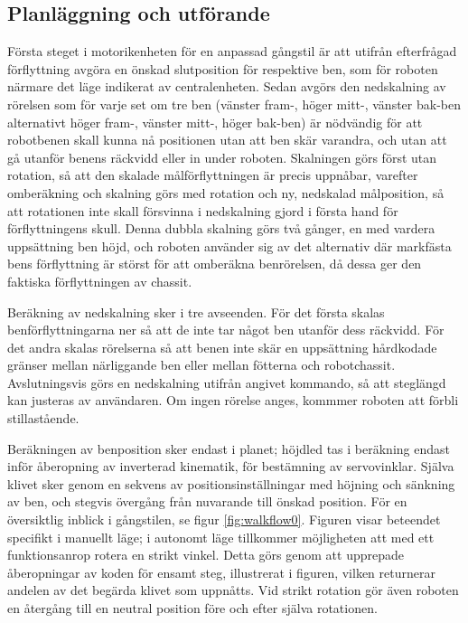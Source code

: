 \documentclass[a4paper,titlepage,12pt]{article}
\begin{document}
		\subsection{Planläggning och utförande}
	Första steget i motorikenheten för en anpassad gångstil är att utifrån efterfrågad
	förflyttning avgöra en önskad slutposition för respektive ben, som för roboten närmare 
	det läge indikerat av centralenheten. Sedan avgörs den nedskalning av rörelsen som för 
	varje set om tre ben (vänster fram-, höger mitt-, vänster bak-ben alternativt höger fram-, 
	vänster mitt-, höger bak-ben) är nödvändig för att robotbenen skall kunna nå positionen utan att ben 
        skär varandra, och utan att gå utanför benens räckvidd eller in under roboten. Skalningen 
        görs först utan rotation, så att den skalade målförflyttningen är precis uppnåbar, varefter omberäkning 
        och skalning görs med rotation och ny, nedskalad målposition, så att rotationen inte skall 
        försvinna i nedskalning gjord i första hand för förflyttningens skull. Denna dubbla skalning 
        görs två gånger, en med vardera uppsättning ben höjd, och roboten använder sig av det 
        alternativ där markfästa bens förflyttning är störst för att omberäkna benrörelsen, då dessa 
        ger den faktiska förflyttningen av chassit. 

	Beräkning av nedskalning sker i tre avseenden. För det första skalas benförflyttningarna 
	ner så att de inte tar något ben utanför dess räckvidd. För det andra skalas  rörelserna så 
	att benen inte skär en uppsättning hårdkodade gränser mellan närliggande ben eller mellan 
	fötterna och robotchassit. Avslutningsvis görs en nedskalning utifrån angivet kommando, så 
	att steglängd kan justeras av användaren. Om ingen rörelse anges, kommmer roboten att förbli 
	stillastående.

	Beräkningen av benposition sker endast i planet; höjdled tas i beräkning endast inför åberopning 
	av inverterad kinematik, för bestämning av servovinklar. Själva klivet sker genom en sekvens av 
	positionsinställningar med höjning och sänkning av ben, och stegvis övergång från nuvarande till 
	önskad position. För en översiktlig inblick i 
	gångstilen, se figur \ref{fig:walkflow0}. Figuren visar beteendet specifikt i manuellt läge;
	i autonomt läge tillkommer möjligheten att med ett funktionsanrop rotera en strikt vinkel.
	Detta görs genom att upprepade åberopningar av koden för ensamt steg, illustrerat i figuren, 
	vilken returnerar andelen av det begärda klivet som uppnåtts. Vid strikt rotation gör även 
	roboten en återgång till en neutral position före och efter själva rotationen.
	
\end{document}
